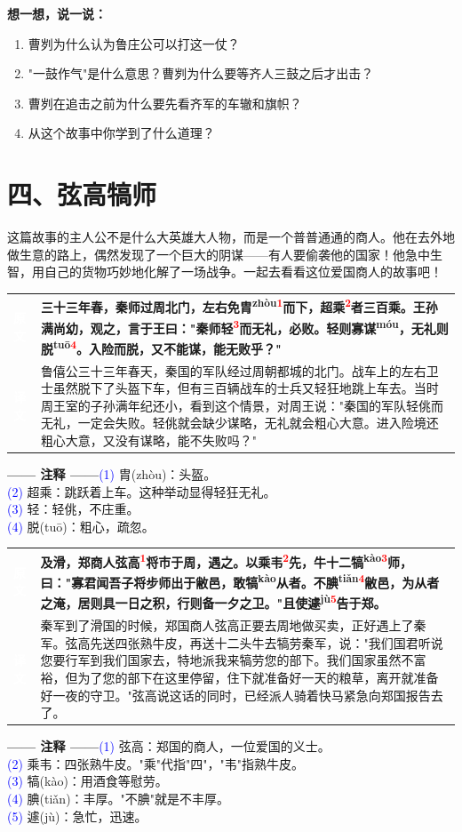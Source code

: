 \documentclass[a4paper,12pt]{ctexart}
\makeatletter
\newcommand{\ruby}[2]{#1\textsuperscript{#2}}
\newlength{\colA}\setlength{\colA}{0.06\textwidth}
\newlength{\colB}\setlength{\colB}{0.64\textwidth}
\newlength{\colC}\setlength{\colC}{0.26\textwidth}
\newcommand{\sectab}[3]{%
  \noindent
  \begin{minipage}[c]{\dimexpr\colA+\colB+2\tabcolsep\relax}
  \begin{tabular}{@{}p{\colA}p{\colB}@{}}
  \sideyuan  & {\large\bfseries #1} \\
  \sideyiwen & {\large #2} \\
  \end{tabular}
  \end{minipage}
  \hfill
  \begin{minipage}[c]{\colC}
  {\labelann\vspace{0.1cm}}#3
  \end{minipage}
  \par
}
\newcommand{\sideyuan}{\colorbox{blue!70!black}{\textcolor{white}{\normalsize\textbf{原文}}}}
\newcommand{\sideyiwen}{\colorbox{green!60!black}{\textcolor{white}{\normalsize\textbf{译文}}}}
\newcommand{\labelann}{\textcolor{orange!80!black}{\small\textbf{—— 注释 ——}}}
\newcommand{\refmark}[1]{\textsuperscript{\textcolor{red}{#1}}}
\makeatother
\begin{document}
\vspace{0.3cm}
{\large\textcolor{orange!80!black}{\textbf{想一想，说一说：}}}
\begin{enumerate}
  \item 曹刿为什么认为鲁庄公可以打这一仗？
  \item "一鼓作气"是什么意思？曹刿为什么要等齐人三鼓之后才出击？
  \item 曹刿在追击之前为什么要先看齐军的车辙和旗帜？
  \item 从这个故事中你学到了什么道理？
\end{enumerate}

\newpage

\section*{\textcolor{orange!80!black}{四、弦高犒师}}

这篇故事的主人公不是什么大英雄大人物，而是一个普普通通的商人。他在去外地做生意的路上，偶然发现了一个巨大的阴谋——有人要偷袭他的国家！他急中生智，用自己的货物巧妙地化解了一场战争。一起去看看这位爱国商人的故事吧！

\vspace{0.3cm}
\sectab{三十三年春，秦师过周北门，左右免\ruby{胄}{zhòu}\refmark{1}而下，超乘\refmark{2}者三百乘。王孙满尚幼，观之，言于王曰："秦师轻\refmark{3}而无礼，必败。轻则寡\ruby{谋}{móu}，无礼则\ruby{脱}{tuō}\refmark{4}。入险而脱，又不能谋，能无败乎？"}{鲁僖公三十三年春天，秦国的军队经过周朝都城的北门。战车上的左右卫士虽然脱下了头盔下车，但有三百辆战车的士兵又轻狂地跳上车去。当时周王室的子孙满年纪还小，看到这个情景，对周王说："秦国的军队轻佻而无礼，一定会失败。轻佻就会缺少谋略，无礼就会粗心大意。进入险境还粗心大意，又没有谋略，能不失败吗？"}{{\small \textcolor{blue}{(1)} 胄(zhòu)：头盔。}\\[0.1cm]{\small \textcolor{blue}{(2)} 超乘：跳跃着上车。这种举动显得轻狂无礼。}\\[0.1cm]{\small \textcolor{blue}{(3)} 轻：轻佻，不庄重。}\\[0.1cm]{\small \textcolor{blue}{(4)} 脱(tuō)：粗心，疏忽。}}

\vspace{0.3cm}
\sectab{及滑，郑商人弦高\refmark{1}将市于周，遇之。以乘韦\refmark{2}先，牛十二\ruby{犒}{kào}\refmark{3}师，曰："寡君闻吾子将步师出于敝邑，敢\ruby{犒}{kào}从者。不\ruby{腆}{tiǎn}\refmark{4}敝邑，为从者之淹，居则具一日之积，行则备一夕之卫。"且使\ruby{遽}{jù}\refmark{5}告于郑。}{秦军到了滑国的时候，郑国商人弦高正要去周地做买卖，正好遇上了秦军。弦高先送四张熟牛皮，再送十二头牛去犒劳秦军，说："我们国君听说您要行军到我们国家去，特地派我来犒劳您的部下。我们国家虽然不富裕，但为了您的部下在这里停留，住下就准备好一天的粮草，离开就准备好一夜的守卫。"弦高说这话的同时，已经派人骑着快马紧急向郑国报告去了。}{{\small \textcolor{blue}{(1)} 弦高：郑国的商人，一位爱国的义士。}\\[0.1cm]{\small \textcolor{blue}{(2)} 乘韦：四张熟牛皮。"乘"代指"四"，"韦"指熟牛皮。}\\[0.1cm]{\small \textcolor{blue}{(3)} 犒(kào)：用酒食等慰劳。}\\[0.1cm]{\small \textcolor{blue}{(4)} 腆(tiǎn)：丰厚。"不腆"就是不丰厚。}\\[0.1cm]{\small \textcolor{blue}{(5)} 遽(jù)：急忙，迅速。}}
\end{document}
